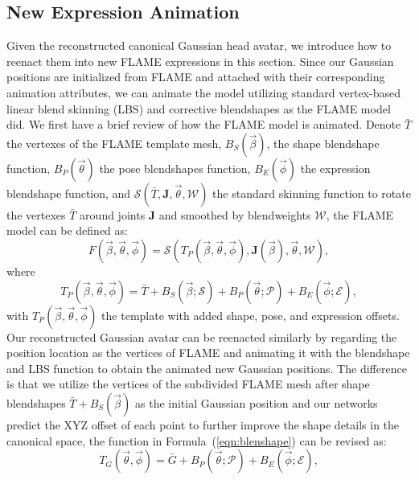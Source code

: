 \subsection{New Expression Animation}
Given the reconstructed canonical Gaussian head avatar, we introduce how to reenact them into new FLAME expressions in this section. Since our Gaussian positions are initialized from FLAME and attached with their corresponding animation attributes, we can animate the model utilizing standard vertex-based linear blend skinning (LBS) and corrective blendshapes as the FLAME model did. We first have a brief review of how the FLAME model is animated. Denote $\bar{T}$ the vertexes of the FLAME template mesh, $B_{S}(\vec{\beta})$, the shape blendshape function, $B_{P}(\vec{\theta})$ the pose blendshapes function, $B_{E}(\vec{\phi})$ the expression blendshape function, and $\mathcal{S}(\bar{T}, \textbf{J}, \vec{\theta}, \mathcal{W})$ the standard skinning function to rotate the vertexes $\bar{T}$ around joints $\textbf{J}$ and smoothed by blendweights $\mathcal{W}$, the FLAME model can be defined as:
\begin{equation}
    \label{eqn:LBS}
    F(\vec{\beta}, \vec{\theta}, \vec{\phi}) = \mathcal{S}(T_{P}(\vec{\beta}, \vec{\theta}, \vec{\phi}), \textbf{J}(\vec{\beta}), \vec{\theta}, \mathcal{W}),
\end{equation}
where
\begin{equation}
    \label{eqn:blenshape}
    T_{P}(\vec{\beta}, \vec{\theta}, \vec{\phi}) = \bar{T} + B_{S}(\vec{\beta}; \mathcal{S}) + B_{P}(\vec{\theta}; \mathcal{P}) + B_{E}(\vec{\phi}; \mathcal{E}),
\end{equation}
with $T_{P}(\vec{\beta}, \vec{\theta}, \vec{\phi})$ the template with added shape, pose, and expression offsets. Our reconstructed Gaussian avatar can be reenacted similarly by regarding the position location as the vertices of FLAME and animating it with the blendshape and LBS function to obtain the animated new Gaussian positions. The difference is that we utilize the vertices of the subdivided FLAME mesh after shape blendshapes $\bar{T} + B_{S}(\vec{\beta})$ as the initial Gaussian position and our networks predict the XYZ offset of each point to further improve the shape details in the canonical space, the function in Formula~(\ref{eqn:blenshape}) can be revised as:
\begin{equation}
    \label{eqn:gsblendshape}
    T_{G}(\vec{\theta}, \vec{\phi}) = \bar{G} + B_{P}(\vec{\theta}; \mathcal{P}) + B_{E}(\vec{\phi}; \mathcal{E}), 
\end{equation}
